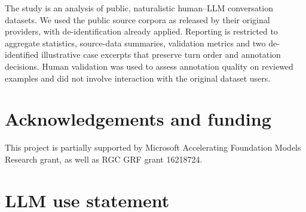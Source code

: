 The study is an analysis of public, naturalistic human--LLM conversation datasets. 
We used the public source corpora as released by their original providers, with de-identification already applied. Reporting is restricted to aggregate statistics, source-data summaries, validation metrics and two de-identified illustrative case excerpts that preserve turn order and annotation decisions.
Human validation was used to assess annotation quality on reviewed examples and did not involve interaction with the original dataset users.


\section*{Acknowledgements and funding}

This project is partially supported by Microsoft Accelerating Foundation Models Research grant, as well as RGC GRF grant 16218724.


\section*{LLM use statement}

